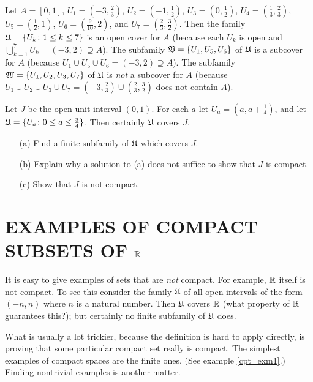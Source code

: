 \begin{exam} Let $A = [0,1]$, $U_1 = (-3,\frac23)$, $U_2 = (-1,\frac12)$, $U_3 = (0,\frac12)$,
$U_4 = (\frac13,\frac23)$, $U_5 = (\frac12,1)$, $U_6 = (\frac9{10},2)$, and $U_7 =
(\frac23,\frac32)$.  Then the family $\mathfrak{U} = \{U_k \colon 1 \le k \le 7\}$ is an open
cover for $A$ (because each $U_k$ is open and $\bigcup_{k=1}^7U_k = (-3,2) \supseteq A$).
The subfamily $\mathfrak{V} = \{U_1, U_5, U_6\}$ of $\mathfrak{U}$ is a subcover for $A$ (because
$U_1 \cup U_5 \cup U_6 = (-3,2) \supseteq A$). The subfamily $\mathfrak{W} = \{U_1, U_2, U_3,
U_7\}$ of $\mathfrak{U}$ is \emph{not} a subcover for $A$ (because $U_1 \cup U_2 \cup U_3 \cup
U_7 = (-3,\frac23) \cup (\frac23,\frac32)$ does not contain $A$).
\end{exam}

\begin{prob} Let $J$ be the open unit interval $(0,1)$. For each $a$ let $U_a =
\left(a,a + \frac14 \right)$, and let $\mathfrak{U} = \{U_a \colon 0 \le a \le \frac34\}$.
Then certainly $\mathfrak{U}$ covers $J$.
 \begin{enumerate}
  \item[(a)] Find a finite subfamily of $\mathfrak{U}$ which covers $J$.
  \item[(b)] Explain why a solution to (a) does not suffice to show that $J$ is compact.
  \item[(c)] Show that $J$ is not compact.
 \end{enumerate}
\end{prob}








\section{EXAMPLES OF COMPACT SUBSETS OF $\mathbb{R}$}
It is easy to give examples of sets that are \emph{not} compact. For example, $\mathbb{R}$ itself
is not compact.  To see this consider the family $\mathfrak{U}$ of all open intervals of the
form $(-n,n)$ where $n$ is a natural number.  Then $\mathfrak{U}$ covers $\mathbb{R}$ (what property
of $\mathbb{R}$ guarantees this?); but certainly no finite subfamily of $\mathfrak{U}$ does.

What is usually a lot trickier, because the definition is hard to apply directly, is proving
that some particular compact set really is compact. The simplest examples of compact spaces
are the finite ones.  (See example \ref{cpt_exm1}.)  Finding nontrivial examples is another
matter.

